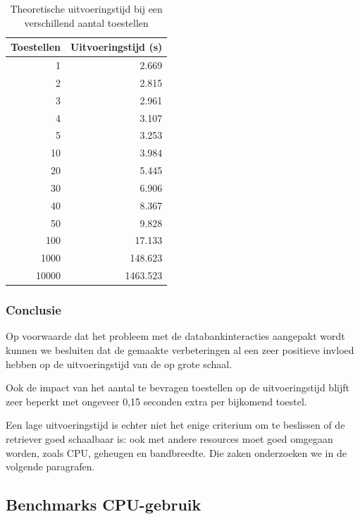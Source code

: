 \begin{table}[h]
\centering
\begin{tabular}{@{}rr@{}}
\toprule
Toestellen & Uitvoeringstijd (s) \\ \midrule
1          & 2.669               \\
2          & 2.815               \\
3          & 2.961               \\
4          & 3.107               \\
5          & 3.253               \\
10         & 3.984               \\
20         & 5.445               \\
30         & 6.906               \\
40         & 8.367               \\
50         & 9.828               \\
100        & 17.133              \\
1000       & 148.623             \\
10000      & 1463.523            \\ \bottomrule
\end{tabular}
\caption{Theoretische uitvoeringstijd bij een verschillend aantal toestellen}
\label{tabel-theoretische-uitvoeringstijd}
\end{table}

\subsubsection{Conclusie}

Op voorwaarde dat het probleem met de databankinteracties aangepakt wordt kunnen we besluiten dat de gemaakte verbeteringen
al een zeer positieve invloed hebben op de uitvoeringstijd van de \nwmretriever{} op grote schaal.

Ook de impact van het aantal te bevragen toestellen op de uitvoeringstijd blijft zeer beperkt met ongeveer 0,15 seconden extra per bijkomend toestel.

Een lage uitvoeringstijd is echter niet het enige criterium om te beslissen of de retriever goed schaalbaar is:
ook met andere resources moet goed omgegaan worden, zoals CPU, geheugen en bandbreedte.
Die zaken onderzoeken we in de volgende paragrafen.


\subsection{Benchmarks CPU-gebruik}
\label{cpu-gebruik}

